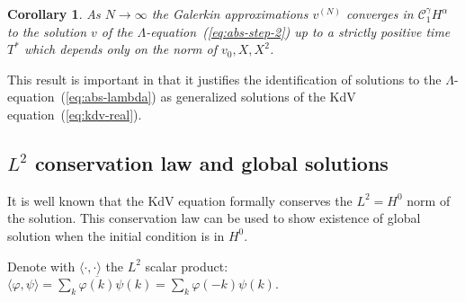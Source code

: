 \documentclass[a4paper,11pt,reqno]{article}
\newcommand{\CC}{\mathcal{C}}
\newtheorem{corollary}[theorem]{Corollary}
\begin{document}
\begin{corollary}
As $N \to \infty$ the Galerkin approximations $v^{(N)}$ converges in $\CC_1^\gamma H^\alpha$ to
the solution $v$ of the $\Lambda$-equation~(\ref{eq:abs-step-2}) up to a strictly positive time $T^*$ which depends only on the norm of $v_0,X,X^2$.  
\end{corollary}

This result is important in that it justifies the identification of
solutions to the $\Lambda$-equation~(\ref{eq:abs-lambda}) as
generalized solutions of the  KdV equation~(\ref{eq:kdv-real}). 



\subsection{$L^2$ conservation law and global solutions}
\label{sec:global}
It is well known that the KdV equation formally conserves the $L^2 =
H^0$ norm of the solution. This conservation law can be used to show
existence of global solution when the initial condition is in $H^0$. 

 
Denote with $\langle \cdot,\cdot \rangle$ the $L^2$ scalar product:
$
\langle \varphi,\psi \rangle = \sum_k \overline{\varphi(k)} \psi(k) =
\sum_k \varphi(-k) \psi(k)
$.
\end{document}
